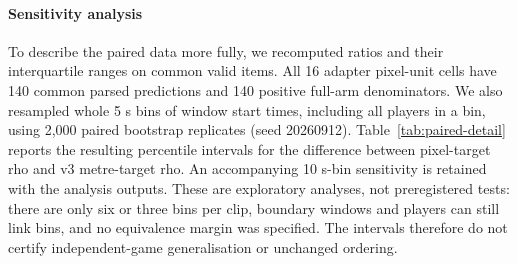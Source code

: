 \documentclass[11pt]{article}
\begin{document}
\paragraph{Sensitivity analysis} To describe the paired data more
fully, we recomputed ratios and their interquartile ranges on common valid
items. All 16 adapter pixel-unit cells have 140 common parsed predictions and
140 positive full-arm denominators. We also resampled whole 5 s bins of window
start times, including all players in a bin, using 2,000 paired bootstrap
replicates (seed 20260912). Table~\ref{tab:paired-detail} reports the resulting
percentile intervals for the difference between pixel-target rho and v3
metre-target rho. An accompanying 10 s-bin sensitivity is retained with the
analysis outputs. These are exploratory analyses, not preregistered tests:
there are only six or three bins per clip, boundary windows and players can
still link bins, and no equivalence margin was specified. The intervals
therefore do not certify independent-game generalisation or unchanged ordering.
\end{document}
